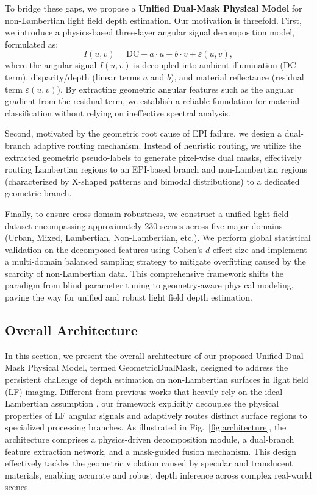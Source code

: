 \documentclass[lettersize,journal]{IEEEtran}
\begin{document}
To bridge these gaps, we propose a \textbf{Unified Dual-Mask Physical Model} for non-Lambertian light field depth estimation. Our motivation is threefold. First, we introduce a physics-based three-layer angular signal decomposition model, formulated as:
\begin{equation}
    I(u,v) = \text{DC} + a \cdot u + b \cdot v + \varepsilon(u,v),
    \label{eq:ch2_1}
\end{equation}
where the angular signal $I(u,v)$ is decoupled into ambient illumination (DC term), disparity/depth (linear terms $a$ and $b$), and material reflectance (residual term $\varepsilon(u,v)$). By extracting geometric angular features such as the angular gradient from the residual term, we establish a reliable foundation for material classification without relying on ineffective spectral analysis.

Second, motivated by the geometric root cause of EPI failure, we design a dual-branch adaptive routing mechanism. Instead of heuristic routing, we utilize the extracted geometric pseudo-labels to generate pixel-wise dual masks, effectively routing Lambertian regions to an EPI-based branch and non-Lambertian regions (characterized by X-shaped patterns and bimodal distributions) to a dedicated geometric branch. 

Finally, to ensure cross-domain robustness, we construct a unified light field dataset encompassing approximately 230 scenes across five major domains (Urban, Mixed, Lambertian, Non-Lambertian, etc.). We perform global statistical validation on the decomposed features using Cohen's $d$ effect size and implement a multi-domain balanced sampling strategy to mitigate overfitting caused by the scarcity of non-Lambertian data. This comprehensive framework shifts the paradigm from blind parameter tuning to geometry-aware physical modeling, paving the way for unified and robust light field depth estimation.


\subsection{Overall Architecture}

In this section, we present the overall architecture of our proposed Unified Dual-Mask Physical Model, termed GeometricDualMask, designed to address the persistent challenge of depth estimation on non-Lambertian surfaces in light field (LF) imaging. Different from previous works that heavily rely on the ideal Lambertian assumption \cite{smith2023epinet}, our framework explicitly decouples the physical properties of LF angular signals and adaptively routes distinct surface regions to specialized processing branches. As illustrated in Fig.~\ref{fig:architecture}, the architecture comprises a physics-driven decomposition module, a dual-branch feature extraction network, and a mask-guided fusion mechanism. This design effectively tackles the geometric violation caused by specular and translucent materials, enabling accurate and robust depth inference across complex real-world scenes.
\end{document}
